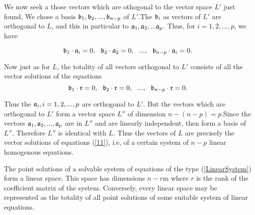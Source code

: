 We now seek a those vectors which are othogonal to the vector space $L'$ just found, We chose a basis $\mathfrak{b}_1, \mathfrak{b}_2, ..., \mathfrak{b}_{n-p}$ of $L'$.The $\mathfrak{b}_i$ as vectors of $L'$ are orthogonal to $L$, and this in particular to 
$\mathfrak{a}_1, \mathfrak{a}_2, ... \mathfrak{a}_p$. Thus, for $i=1, 2, ..., p$, we have

$$\mathfrak{b}_1 \cdot \mathfrak{a}_i = 0, ~~\mathfrak{b}_2 \cdot \mathfrak{a}_2 = 0, ~~..., ~~\mathfrak{b}_{n-p} \cdot \mathfrak{a}_i = 0.$$

Now just as for $L$, the totality of all vectors orthogonal to $L'$ consists of all the vector solutions of the equations
\begin{equation}\mathfrak{b}_1 \cdot \mathfrak{r} = 0, ~~\mathfrak{b}_2 \cdot \mathfrak{r} = 0, ~~..., ~~\mathfrak{b}_{n-p} \cdot \mathfrak{r} = 0.\label{11}\end{equation}
 
 Thus the $\mathfrak{a}_i, i =1,2, ..., p$ are orthogonal to $L'$. But the vectors which are orthogonal to $L'$ form a vector space $L''$ of dimension $n - (n-p) = p$.Since the vectors $\mathfrak{a}_1, \mathfrak{a}_2, ..., \mathfrak{a}_p$ are in $L''$ and are 
 linearly independent, then form a basis of $L''$. Therefore $L''$ is identical with $L$. Thus the vectors of $L$ are precisely the vector solutions of equations (\ref{11}), i.e, of a certain system of $n-p$ linear homogenous equations.
 
 \begin{theorem}
 The point solutions of a solvable system of equations of the type (\ref{LinearSystem}) form a linear space. This space has dimensions $n-r$m where $r$ is the rank of the coefficient matrix of the system. Conversely, every linear
 space may be represented as the totality of all point solutions of some suitable system of linear equations. 
 \end{theorem} 
 
